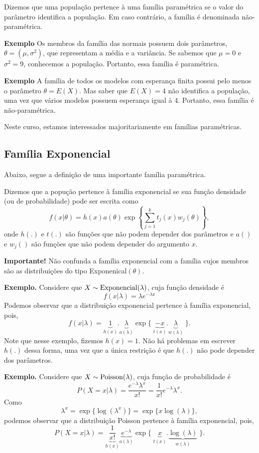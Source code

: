 \documentclass[
  letterpaper,
  DIV=11,
  numbers=noendperiod]{scrreprt}
\begin{document}
Dizemos que uma população pertence à uma família paramétrica se o valor
do parâmetro identifica a população. Em caso contrário, a família é
denominada não-paramétrica.

\textbf{Exemplo} Os membros da família das normais possuem dois
parâmetros, \(\theta=(\mu,\sigma^2)\), que representam a média e a
variância. Se sabemos que \(\mu=0\) e \(\sigma^2=9\), conhecemos a
população. Portanto, essa família é paramétrica.

\textbf{Exemplo} A família de todos os modelos com esperança finita
possui pelo menos o parâmetro \(\theta=E(X)\). Mas saber que \(E(X)=4\)
não identifica a população, uma vez que vários modelos possuem esperança
igual à 4. Portanto, essa família é não-paramétrica.

Neste curso, estamos interessados majoritariamente em famílias
paramétricas.

\subsection{Família Exponencial}\label{famuxedlia-exponencial}

Abaixo, segue a definição de uma importante família paramétrica.

Dizemos que a popução pertence à família exponencial se sua função
densidade (ou de probabilidade) pode ser escrita como
\[f(x|\theta)=h(x)a(\theta)\exp\left\{\sum_{j=1}^k t_j(x)w_j(\theta)\right\},\]
onde \(h(.)\) e \(t(.)\) são funções que não podem depender dos
parâmetros e \(a()\) e \(w_j()\) são funções que não podem depender do
argumento \(x\).

\textbf{Importante!} Não confunda a família exponencial com a família
cujos membros são as distribuições do tipo Exponenical\((\theta)\).

\textbf{Exemplo.} Considere que \(X\sim\hbox{Exponencial}(\lambda)\),
cuja função densidade é \[f(x|\lambda)=\lambda e^{-\lambda x}\] Podemos
observar que a distribuição exponencial pertence à família exponencial,
pois,
\[f(x|\lambda)=\underbrace{1}_{h(x)}.\underbrace{\lambda}_{a(\lambda)}\exp\{\;\underbrace{-x}_{t(x)}.\underbrace{\lambda}_{w(\lambda)}\;\}.\]
Note que nesse exemplo, fizemos \(h(x)=1\). Não há problemas em escrever
\(h(.)\) dessa forma, uma vez que a única restrição é que \(h(.)\) não
pode depender dos parâmetros.

\textbf{Exemplo.} Considere que \(X\sim\hbox{Poisson}(\lambda)\), cuja
função de probabilidade é
\[P(X=x|\lambda)=\frac{e^{-\lambda}\lambda^x}{x!}=\frac{1}{x!}e^{-\lambda}\lambda^x.\]
Como \[\lambda^x = \exp\{\log(\lambda^x)\}=\exp\{x\log(\lambda)\},\]
podemos observar que a distribuição Poisson pertence à família
exponencial, pois,
\[P(X=x|\lambda)=\underbrace{\frac{1}{x!}}_{h(x)}\underbrace{e^{-\lambda}}_{a(\lambda)}\exp\{\;\underbrace{x}_{t(x)}.\underbrace{\log(\lambda)}_{w(\lambda)}\;\}.\]
\end{document}
